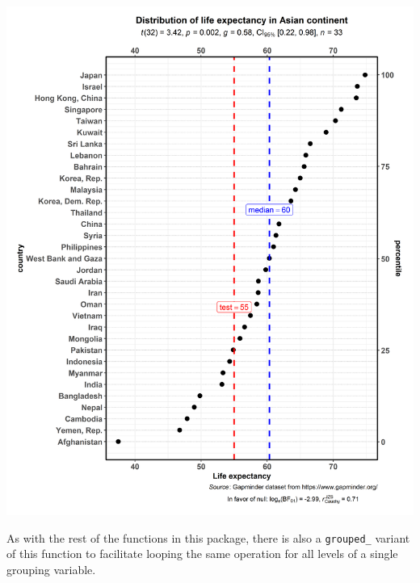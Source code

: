 \documentclass[]{article}
\begin{document}
\includegraphics[width=1\linewidth]{./figures/paper-ggdotplotstats1-1}

As with the rest of the functions in this package, there is also a
\texttt{grouped\_} variant of this function to facilitate looping the
same operation for all levels of a single grouping variable.
\end{document}
